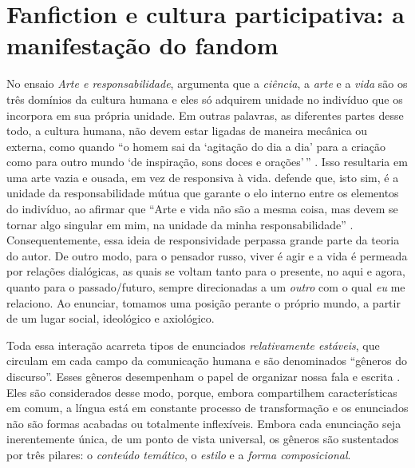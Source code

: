 
\section{Fanfiction e cultura participativa: a manifestação do fandom}\label{sec-fanfictionecultura}

No ensaio \emph{Arte e responsabilidade}, \textcite{bakhtin_arte_2003} argumenta que a
\emph{ciência}, a \emph{arte} e a \emph{vida} são os três domínios da
cultura humana e eles só adquirem unidade no indivíduo que os incorpora
em sua própria unidade. Em outras palavras, as diferentes partes desse
todo, a cultura humana, não devem estar ligadas de maneira mecânica ou
externa, como quando ``o homem sai da `agitação do dia a dia' para a
criação como para outro mundo `de inspiração, sons doces e orações'\,''
\cite[p.~33]{bakhtin2011}. Isso resultaria em uma arte vazia e ousada, em
vez de responsiva à vida. \textcite{bakhtin2011} defende que, isto sim, é a
unidade da responsabilidade mútua que garante o elo interno entre os
elementos do indivíduo, ao afirmar que ``Arte e vida não são a mesma
coisa, mas devem se tornar algo singular em mim, na unidade da minha
responsabilidade'' \cite[p.~34]{bakhtin2011}. Consequentemente, essa ideia de
responsividade perpassa grande parte da teoria do autor. De outro modo,
para o pensador russo, viver é agir e a vida é permeada por relações
dialógicas, as quais se voltam tanto para o presente, no aqui e agora,
quanto para o passado/futuro, sempre direcionadas a um \emph{outro} com
o qual \emph{eu} me relaciono. Ao enunciar, tomamos uma posição perante
o próprio mundo, a partir de um lugar social, ideológico e axiológico.

Toda essa interação acarreta tipos de enunciados \emph{relativamente
estáveis}, que circulam em cada campo da comunicação humana e são
denominados ``gêneros do discurso''. Esses gêneros desempenham o papel
de organizar nossa fala e escrita \cite[p.~262]{bakhtin2011}. Eles são
considerados desse modo, porque, embora compartilhem características em
comum, a língua está em constante processo de transformação e os
enunciados não são formas acabadas ou totalmente inflexíveis. Embora
cada enunciação seja inerentemente única, de um ponto de vista
universal, os gêneros são sustentados por três pilares: o \emph{conteúdo
temático}, o \emph{estilo} e a \emph{forma composicional}.

